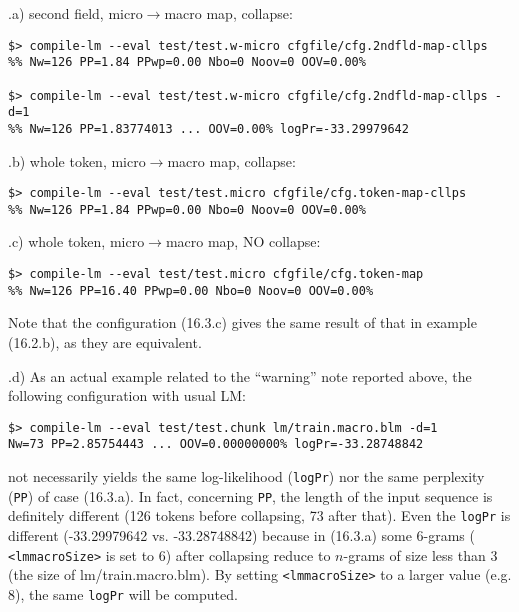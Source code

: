 \noindent \thesubsection.a) second field, micro$\rightarrow$macro map, collapse:
\begin{verbatim}
$> compile-lm --eval test/test.w-micro cfgfile/cfg.2ndfld-map-cllps
%% Nw=126 PP=1.84 PPwp=0.00 Nbo=0 Noov=0 OOV=0.00%

$> compile-lm --eval test/test.w-micro cfgfile/cfg.2ndfld-map-cllps -d=1
%% Nw=126 PP=1.83774013 ... OOV=0.00% logPr=-33.29979642

\end{verbatim}

\noindent
\thesubsection.b) whole token,  micro$\rightarrow$macro map, collapse:
\begin{verbatim}
$> compile-lm --eval test/test.micro cfgfile/cfg.token-map-cllps
%% Nw=126 PP=1.84 PPwp=0.00 Nbo=0 Noov=0 OOV=0.00%
\end{verbatim}

\noindent
\thesubsection.c)  whole token,  micro$\rightarrow$macro map, NO collapse:
\begin{verbatim}
$> compile-lm --eval test/test.micro cfgfile/cfg.token-map
%% Nw=126 PP=16.40 PPwp=0.00 Nbo=0 Noov=0 OOV=0.00%
\end{verbatim}
\noindent Note that the configuration (16.3.c) gives the same result of that in
example (16.2.b), as they are equivalent.

\bigskip
\noindent
\thesubsection.d) As an actual example related to the ``warning'' note
reported above, the following configuration with usual LM:

\begin{verbatim}
$> compile-lm --eval test/test.chunk lm/train.macro.blm -d=1
Nw=73 PP=2.85754443 ... OOV=0.00000000% logPr=-33.28748842
\end{verbatim}

\noindent not necessarily yields the same log-likelihood ({\tt logPr}) nor the same perplexity ({\tt PP}) of case (16.3.a).
In fact, concerning {\tt PP}, the length of the input sequence is definitely different (126 tokens before collapsing, 73 after that).
Even the {\tt logPr} is different (-33.29979642 vs. -33.28748842) because in (16.3.a) some 6-grams ({\tt
<lmmacroSize>} is set to 6) after collapsing reduce to $n$-grams of size less
than 3 (the size of lm/train.macro.blm). By setting {\tt <lmmacroSize>} to
a larger value (e.g. 8), the same {\tt logPr} will be computed.


